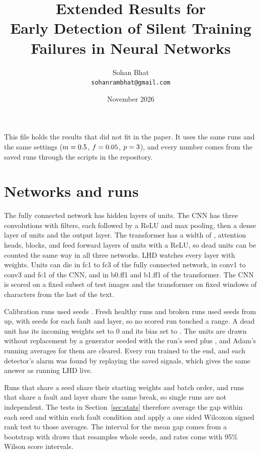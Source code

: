 \documentclass[11pt]{article}
\title{Extended Results for\\ Early Detection of Silent Training Failures in Neural Networks}
\author{Sohan Bhat\\ \small \texttt{sohanrambhat@gmail.com}}
\date{November 2026}
\begin{document}
\maketitle

This file holds the results that did not fit in the paper. It uses the same \lhdRuns{} runs and the same settings ($m = 0.5$, $f = 0.05$, $p = 3$), and every number comes from the saved runs through the scripts in the repository.

\section{Networks and runs}
\label{sec:networks}

The fully connected network has hidden layers of \lhdMlpWidths{} units. The CNN has three convolutions with \lhdCnnFilters{} filters, each followed by a ReLU and max pooling, then a dense layer of \lhdCnnDense{} units and the output layer. The transformer has a width of \lhdTransformerWidth{}, \lhdTransformerHeads{} attention heads, \lhdTransformerBlocks{} blocks, and feed forward layers of \lhdTransformerHidden{} units with a ReLU, so dead units can be counted the same way in all three networks. LHD watches every layer with weights. Units can die in fc1 to fc3 of the fully connected network, in conv1 to conv3 and fc1 of the CNN, and in b0.ff1 and b1.ff1 of the transformer. The CNN is scored on a fixed subset of \lhdCnnValImages{} test images and the transformer on \lhdTextWindows{} fixed windows of \lhdTextContext{} characters from the last \lhdTextHeldOut{} of the text.

Calibration runs used seeds \lhdCalibrationSeeds{}. Fresh healthy runs and broken runs used seeds from \lhdScoredSeedStart{} up, with \lhdSeedsPerFault{} seeds for each fault and layer, so no scored run touched a range. A dead unit has its incoming weights set to 0 and its bias set to \lhdDeadBias{}. The units are drawn without replacement by a generator seeded with the run's seed plus \lhdUnitSeedOffset{}, and Adam's running averages for them are cleared. Every run trained to the end, and each detector's alarm was found by replaying the saved signals, which gives the same answer as running LHD live.

Runs that share a seed share their starting weights and batch order, and runs that share a fault and layer share the same break, so single runs are not independent. The tests in Section~\ref{sec:stats} therefore average the gap within each seed and within each fault condition and apply a one sided Wilcoxon signed rank test to those averages. The interval for the mean gap comes from a bootstrap with \lhdBootstrapDraws{} draws that resamples whole seeds, and rates come with 95\% Wilson score intervals.
\end{document}
